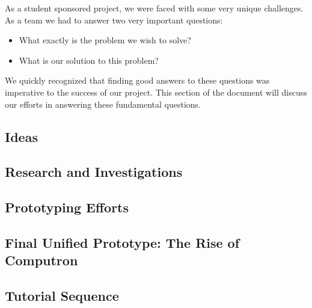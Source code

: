 As a student sponsored project, we were faced with some very unique
challenges. As a team we had to answer two very important questions:
\begin{itemize}
	\item What exactly is the problem we wish to solve?
	\item What is our solution to this problem?
\end{itemize}

We quickly recognized that finding good answers to these questions was imperative to the success of our project. This section of the document will discuss our efforts in answering these fundamental questions.

\subsection{Ideas}
	
\newpage

\subsection{Research and Investigations}
	
\newpage

\subsection{Prototyping Efforts}
	
\newpage

\subsection{Final Unified Prototype: The Rise of Computron}
	
\newpage

\subsection{Tutorial Sequence}
\label{section:tutorial}
	
\newpage
